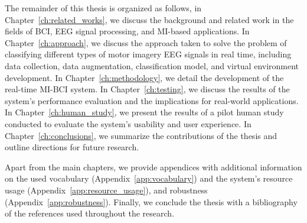 The remainder of this thesis is organized as follows, in Chapter~\ref{ch:related_works}, we discuss the background and related work in the fields of BCI, EEG signal processing, and MI-based applications.
In Chapter~\ref{ch:approach}, we discuss the approach taken to solve the problem of classifying different types of motor imagery EEG signals in real time, including data collection, data augmentation, classification model, and virtual environment development.
In Chapter~\ref{ch:methodology}, we detail the development of the real-time MI-BCI system. %
In Chapter~\ref{ch:testing}, we discuss the results of the system's performance evaluation and the implications for real-world applications.
In Chapter~\ref{ch:human_study}, we present the results of a pilot human study conducted to evaluate the system's usability and user experience.
In Chapter~\ref{ch:conclusions}, we summarize the contributions of the thesis and outline directions for future research.

Apart from the main chapters, we provide appendices with additional information on the used vocabulary (Appendix~\ref{app:vocabulary}) and the system's resource usage (Appendix~\ref{app:resource_usage}), and robustness (Appendix~\ref{app:robustness}).
Finally, we conclude the thesis with a bibliography of the references used throughout the research.
